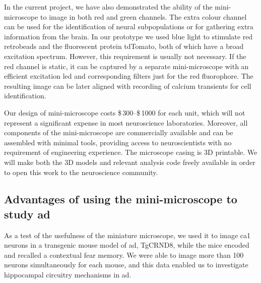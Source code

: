 In the current project, we have also demonstrated the ability of the mini-microscope to image in both red and green channels. The extra colour channel can be used for the identification of neural subpopulations or for gathering extra information from the brain. In our prototype we used blue light to stimulate red retrobeads and the fluorescent protein tdTomato, both of which have a broad excitation spectrum. However, this requirement is usually not necessary. If the red channel is static, it can be captured by a separate mini-microscope with an efficient excitation \gls{led} and corresponding filters just for the red fluorophore. The resulting image can be later aligned with recording of calcium transients for cell identification. 

Our design of mini-microscope costs \$\,300--\$\,1000 for each unit, which will not represent a significant expense in most neuroscience laboratories. Moreover, all components of the mini-microscope are commercially available and can be assembled with minimal tools, providing access to neuroscientists with no requirement of engineering experience. The microscope casing is 3D printable. We will make both the 3D models and relevant analysis code freely available in order to open this work to the neuroscience community.

\subsection{Advantages of using the mini-microscope to study \gls{ad}}

As a test of the usefulness of the miniature microscope, we used it to image \gls{ca1} neurons in a transgenic mouse model of \gls{ad}, TgCRND8, while the mice encoded and recalled a contextual fear memory. We were able to image more than \num{100} neurons simultaneously for each mouse, and this data enabled us to investigate hippocampal circuitry mechanisms in \gls{ad}.


